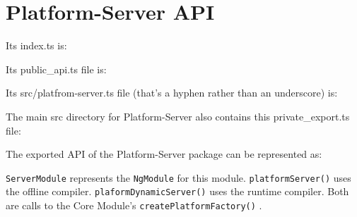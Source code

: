 \section{Platform-Server API}

Its index.ts is:



Its public\_api.ts file is:



Its src/platfrom-server.ts file (that’s a hyphen rather than an underscore) is:



The main src directory for Platform-Server also contains this private\_export.ts file:



The exported API of the Platform-Server package can be represented as:

\texttt{ServerModule}
represents the
\texttt{NgModule}
for this module.
\texttt{platformServer()}
uses the
offline compiler.
\texttt{plaformDynamicServer()}
uses the runtime compiler. Both are calls
to the Core Module’s
\texttt{createPlatformFactory()}
.

